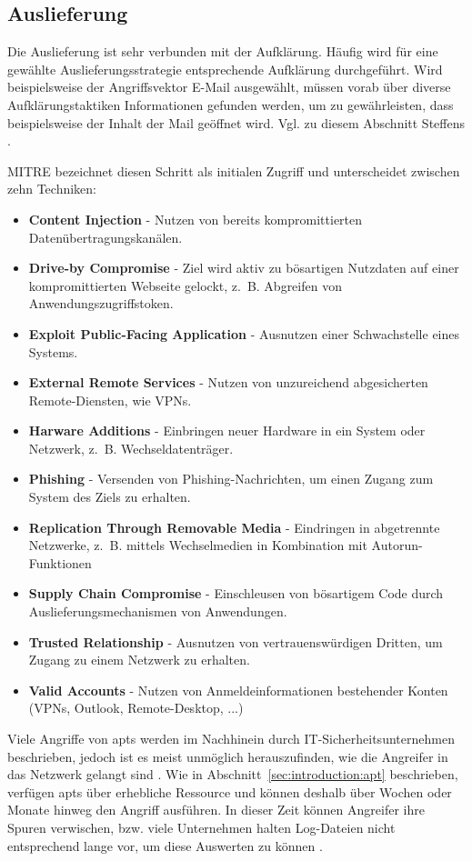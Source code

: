 \documentclass[conference]{IEEEtran}
\begin{document}
\subsection{Auslieferung}
\label{sec:proceeding:delivery}

Die Auslieferung ist sehr verbunden mit der Aufklärung.
Häufig wird für eine gewählte Auslieferungsstrategie entsprechende Aufklärung durchgeführt.
Wird beispielsweise der Angriffsvektor E-Mail ausgewählt, müssen vorab über diverse Aufklärungstaktiken Informationen gefunden werden, um zu gewährleisten, dass beispielsweise der Inhalt der Mail geöffnet wird.
Vgl. zu diesem Abschnitt Steffens \cite[S.~10ff]{Steffens2020}.

MITRE \cite{MITREInitialAccess} bezeichnet diesen Schritt als initialen Zugriff und unterscheidet zwischen zehn Techniken:
\begin{itemize}
    \item \textbf{Content Injection} - Nutzen von bereits kompromittierten Datenübertragungskanälen.
    \item \textbf{Drive-by Compromise} - Ziel wird aktiv zu bösartigen Nutzdaten auf einer kompromittierten Webseite gelockt, z.~B. Abgreifen von Anwendungszugriffstoken.
    \item \textbf{Exploit Public-Facing Application} - Ausnutzen einer Schwachstelle eines Systems.
    \item \textbf{External Remote Services} - Nutzen von unzureichend abgesicherten Remote-Diensten, wie VPNs.
    \item \textbf{Harware Additions} - Einbringen neuer Hardware in ein System oder Netzwerk, z.~B. Wechseldatenträger.
    \item \textbf{Phishing} - Versenden von Phishing-Nachrichten, um einen Zugang zum System des Ziels zu erhalten.
    \item \textbf{Replication Through Removable Media} - Eindringen in abgetrennte Netzwerke, z.~B. mittels Wechselmedien in Kombination mit Autorun-Funktionen
    \item \textbf{Supply Chain Compromise} - Einschleusen von bösartigem Code durch Auslieferungsmechanismen von Anwendungen.
    \item \textbf{Trusted Relationship} - Ausnutzen von vertrauenswürdigen Dritten, um Zugang zu einem Netzwerk zu erhalten.
    \item \textbf{Valid Accounts} - Nutzen von Anmeldeinformationen bestehender Konten (VPNs, Outlook, Remote-Desktop, ...)
\end{itemize}
Viele Angriffe von \acp{apt} werden im Nachhinein durch IT-Sicherheitsunternehmen beschrieben, jedoch ist es meist unmöglich herauszufinden, wie die Angreifer in das Netzwerk gelangt sind \cite[S.~14]{Steffens2020}.
Wie in Abschnitt~\ref{sec:introduction:apt} beschrieben, verfügen \acp{apt} über erhebliche Ressource und können deshalb über Wochen oder Monate hinweg den Angriff ausführen.
In dieser Zeit können Angreifer ihre Spuren verwischen, bzw. viele Unternehmen halten Log-Dateien nicht entsprechend lange vor, um diese Auswerten zu können \cite[S.~15]{Steffens2020}.
\end{document}

